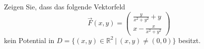Zeigen Sie, dass das folgende Vektorfeld
\[
\vec{F}(x,y)
= \begin{pmatrix}
	\frac{y}{x^2 + y^2} + y \\[1mm]
	x - \frac{x}{x^2 + y^2}
\end{pmatrix}
\]
kein Potential in $D = \{ (x,y) \in \mathbb{R}^2 \ | \ (x,y) \neq (0,0) \}$ besitzt.
